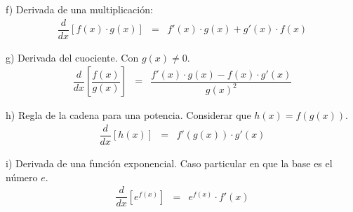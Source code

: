 \noindent f) Derivada de una multiplicación:\\
\begin{eqnarray}
\dfrac{d}{dx}\left[f(x)\cdot g(x) \right]&=& f'(x)\cdot g(x)+g'(x)\cdot f(x)
\end{eqnarray}

\noindent g) Derivada del cuociente. Con $g(x)\neq 0$.\\
\begin{eqnarray}
\dfrac{d}{dx}\left[\dfrac{f(x)}{g(x)}\right]&=& \dfrac{f'(x)\cdot g(x)-f(x)\cdot g'(x)}{g(x)^{2}}
\end{eqnarray}

\noindent h) Regla de la cadena para una potencia. Considerar que $h(x)=f(g(x))$.\\
\begin{eqnarray}
\dfrac{d}{dx}\left[h(x)\right]&=& f'(g(x))\cdot g'(x)
\end{eqnarray}

\noindent i) Derivada de una función exponencial. Caso particular en que la base es el número $e$.\\

\begin{eqnarray}
\dfrac{d}{dx}\left[ e^{f(x)}\right]&=& e^{f(x)}\cdot f'(x)
\end{eqnarray}

